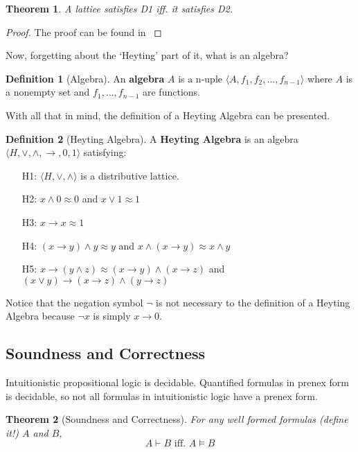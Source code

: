 \documentclass[12pt,a4paper]{article}
\newtheorem{theorem}{Theorem}[section]
\theoremstyle{definition}
\newtheorem{definition}{Definition}[section]
\begin{document}
\begin{theorem}
    A lattice satisfies D1 iff. it satisfies D2.
\end{theorem}

\begin{proof}
    The proof can be found in \cite{sankappanavar1981course}
\end{proof}

Now, forgetting about the `Heyting' part of it, what is an algebra? 

\begin{definition}[Algebra]
    An \textbf{algebra} $A$ is a n-uple $\langle A, f_1, f_2, \ldots, f_{n-1} \rangle$ where $A$ is a nonempty set and $f_1, \ldots, f_{n-1}$ are functions.
\end{definition}

With all that in mind, the definition of a Heyting Algebra can be presented.

\begin{definition}[Heyting Algebra]
    A \textbf{Heyting Algebra} is an algebra $\langle H, \lor, \land, \to, 0, 1 \rangle$ satisfying:
    \begin{itemize}
        \item[H1:] $\langle H, \lor, \land \rangle$ is a distributive lattice.
        \item[H2:] $x \land 0 \approx 0$ and $x \lor 1 \approx 1$
        \item[H3:] $x \to x \approx 1$
        \item[H4:] $(x \to y) \land y \approx y$ and $x \land (x \to y) \approx x \land y$
        \item[H5:] $x \to (y \land z) \approx (x \to y) \land (x \to z)$ and $(x \lor y) \to (x \to z) \land (y \to z)$
    \end{itemize}
\end{definition}

Notice that the negation symbol $\neg$ is not necessary to the definition of a Heyting Algebra because $\neg x$ is simply $x \to 0$.

\subsection{Soundness and Correctness}
\label{SoundAndComplete}

Intuitionistic propositional logic is decidable. Quantified formulas in prenex form is decidable, so not all formulas in intuitionistic logic have a prenex form.

\begin{theorem}[Soundness and Correctness]
For any well formed formulas (define it!) $A$ and $B$, 
    \[ A \vdash B \text{ iff. } A \vDash B \]
\end{theorem}
\end{document}

